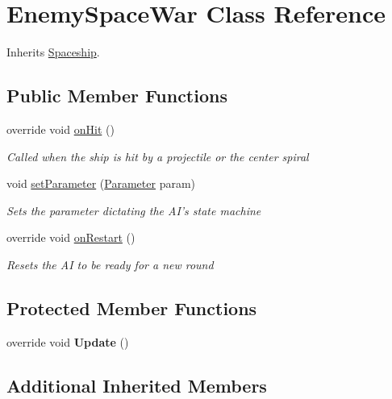 \hypertarget{class_enemy_space_war}{\section{Enemy\-Space\-War Class Reference}
\label{class_enemy_space_war}
}


Inherits \hyperlink{class_spaceship}{Spaceship}.

\subsection*{Public Member Functions}
\begin{DoxyCompactItemize}
\item 
override void \hyperlink{class_enemy_space_war_a37191344bd21999e039e7aa4bd24c770}{on\-Hit} ()
\begin{DoxyCompactList}\small\item\em Called when the ship is hit by a projectile or the center spiral \end{DoxyCompactList}\item 
void \hyperlink{class_enemy_space_war_abf13b69583f56c9c4f807f5ed87e3677}{set\-Parameter} (\hyperlink{class_parameter}{Parameter} param)
\begin{DoxyCompactList}\small\item\em Sets the parameter dictating the A\-I's state machine \end{DoxyCompactList}\item 
override void \hyperlink{class_enemy_space_war_afc11d4a24d2900cebce2386006926f52}{on\-Restart} ()
\begin{DoxyCompactList}\small\item\em Resets the A\-I to be ready for a new round \end{DoxyCompactList}\end{DoxyCompactItemize}
\subsection*{Protected Member Functions}
\begin{DoxyCompactItemize}
\item 
\hypertarget{class_enemy_space_war_a8d2c0384ea480010aec558cdb387619d}{override void {\bfseries Update} ()}\label{class_enemy_space_war_a8d2c0384ea480010aec558cdb387619d}

\end{DoxyCompactItemize}
\subsection*{Additional Inherited Members}


